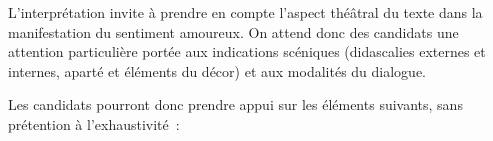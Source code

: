 {L'interprétation invite à prendre en compte l'aspect théâtral du texte dans la
manifestation du sentiment amoureux. On attend donc des candidats une attention
particulière portée aux indications scéniques (didascalies externes et internes, aparté
et éléments du décor) et aux modalités du dialogue.

Les candidats pourront donc prendre appui sur les éléments suivants, sans prétention
à l'exhaustivité~:

}

